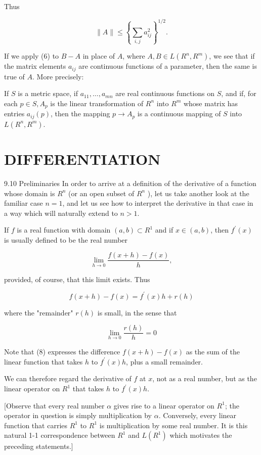 \documentclass[10pt]{article}
\begin{document}
Thus

$$
\|A\| \leq\left\{\sum_{i, j} a_{i j}^{2}\right\}^{1 / 2} .
$$

If we apply (6) to $B-A$ in place of $A$, where $A, B \in L\left(R^{n}, R^{m}\right)$, we see that if the matrix elements $a_{i j}$ are continuous functions of a parameter, then the same is true of $A$. More precisely:

If $S$ is a metric space, if $a_{11}, \ldots, a_{m n}$ are real continuous functions on $S$, and if, for each $p \in S, A_{p}$ is the linear transformation of $R^{n}$ into $R^{m}$ whose matrix has entries $a_{i j}(p)$, then the mapping $p \rightarrow A_{p}$ is a continuous mapping of $S$ into $L\left(R^{n}, R^{m}\right)$.

\section{DIFFERENTIATION}
9.10 Preliminaries In order to arrive at a definition of the derivative of a function whose domain is $R^{n}$ (or an open subset of $R^{n}$ ), let us take another look at the familiar case $n=1$, and let us see how to interpret the derivative in that case in a way which will naturally extend to $n>1$.

If $f$ is a real function with domain $(a, b) \subset R^{1}$ and if $x \in(a, b)$, then $f^{\prime}(x)$ is usually defined to be the real number

$$
\lim _{h \rightarrow 0} \frac{f(x+h)-f(x)}{h},
$$

provided, of course, that this limit exists. Thus

$$
f(x+h)-f(x)=f^{\prime}(x) h+r(h)
$$

where the "remainder" $r(h)$ is small, in the sense that

$$
\lim _{h \rightarrow 0} \frac{r(h)}{h}=0
$$

Note that (8) expresses the difference $f(x+h)-f(x)$ as the sum of the linear function that takes $h$ to $f^{\prime}(x) h$, plus a small remainder.

We can therefore regard the derivative of $f$ at $x$, not as a real number, but as the linear operator on $R^{1}$ that takes $h$ to $f^{\prime}(x) h$.

[Observe that every real number $\alpha$ gives rise to a linear operator on $R^{1}$; the operator in question is simply multiplication by $\alpha$. Conversely, every linear function that carries $R^{1}$ to $R^{1}$ is multiplication by some real number. It is this natural 1-1 correspondence between $R^{1}$ and $L\left(R^{1}\right)$ which motivates the preceding statements.]
\end{document}
